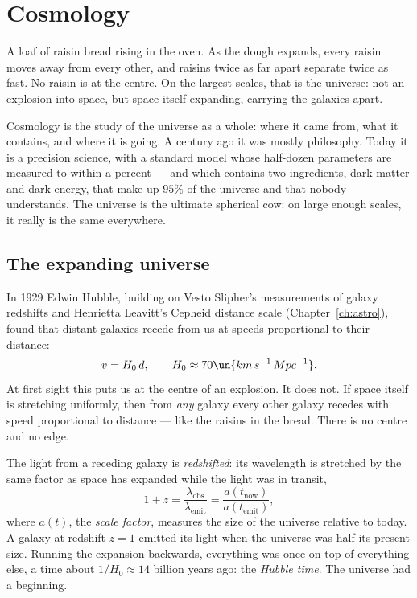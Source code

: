 \chapter{Cosmology}
\label{ch:cosmo}



\begin{prototype}
A loaf of raisin bread rising in the oven. As the dough expands, every raisin moves away from every other, and raisins twice as far apart separate twice as fast. No raisin is at the centre. On the largest scales, that is the universe: not an explosion into space, but space itself expanding, carrying the galaxies apart.
\end{prototype}

Cosmology is the study of the universe as a whole: where it came from, what it contains, and where it is going. A century ago it was mostly philosophy. Today it is a precision science, with a standard model whose half-dozen parameters are measured to within a percent --- and which contains two ingredients, dark matter and dark energy, that make up $95\%$ of the universe and that nobody understands. The universe is the ultimate spherical cow: on large enough scales, it really is the same everywhere.

\section{The expanding universe}

In 1929 Edwin Hubble, building on Vesto Slipher's measurements of galaxy redshifts and Henrietta Leavitt's Cepheid distance scale (Chapter~\ref{ch:astro}), found that distant galaxies recede from us at speeds proportional to their distance:
\[
  v = H_0\,d, \qquad H_0\approx70\un{km\,s^{-1}\,Mpc^{-1}}.
\]
At first sight this puts us at the centre of an explosion. It does not. If space itself is stretching uniformly, then from \emph{any} galaxy every other galaxy recedes with speed proportional to distance --- like the raisins in the bread. There is no centre and no edge.

The light from a receding galaxy is \emph{redshifted}: its wavelength is stretched by the same factor as space has expanded while the light was in transit,
\[
  1 + z = \frac{\lambda_{\text{obs}}}{\lambda_{\text{emit}}} = \frac{a(t_{\text{now}})}{a(t_{\text{emit}})},
\]
where $a(t)$, the \emph{scale factor}, measures the size of the universe relative to today. A galaxy at redshift $z=1$ emitted its light when the universe was half its present size. Running the expansion backwards, everything was once on top of everything else, a time about $1/H_0\approx14$ billion years ago: the \emph{Hubble time}. The universe had a beginning.

